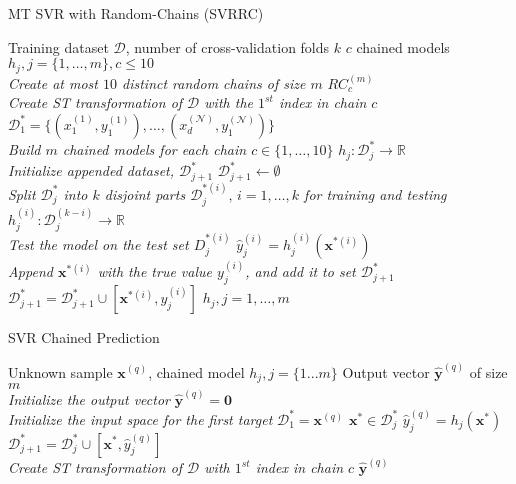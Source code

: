 \documentclass[preprint,12pt]{elsarticle}
\begin{document}
\begin{algorithm}[t!]
\caption{MT SVR with Random-Chains (SVRRC)}
\label{alg:SVRRC} 
\begin{algorithmic}[1]
\renewcommand{\algorithmicrequire}{\textbf{Input:}}
\renewcommand{\algorithmicensure}{\textbf{Output:}}
\REQUIRE Training dataset $\mathcal{D}$, number of cross-validation folds $k$
\ENSURE  $c$ chained models $h_j, j = \{1,\ldots,m\}, c \leq 10$
\\ \textit{Create at most $10$ distinct random chains of size $m$}
\STATE $RC_c^{(m)}$
\\ \textit{Create ST transformation of $\mathcal{D}$ with the $1^{st}$ index in chain $c$}
\STATE $\mathcal{D}_1^* = \{(x_1^{(1)},y_1^{(1)}),\ldots,(x_d^{(\mathcal N)},y_1^{(\mathcal N)})\}$
\\ \textit{Build $m$ chained models for each chain $c \in \{1,\ldots,10\}$}
\STATE $h_j : \mathcal{D}_j^* \rightarrow \mathbb{R}$
\\ \textit{Initialize appended dataset, $\mathcal{D}_{j+1}^*$}
\STATE $\mathcal{D}_{j+1}^* \leftarrow \emptyset$
\\ \textit{Split $\mathcal{D}_j^*$ into $k$ disjoint parts $\mathcal{D}_j^{*(i)}, \, i=1,\ldots,k$ for training and testing}
\STATE $h_j^{(i)} : \mathcal{D}_j^{(k-i)} \rightarrow \mathbb{R}$
\\ \textit{Test the model on the test set $D_j^{*(i)}$}
\STATE $\hat{y}_j^{(i)} = h_j^{(i)}(\bm x^{*(i)})$
\\ \textit{Append $\bm x^{*(i)}$ with the true value $y_j^{(i)}$, and add it to set $\mathcal{D}_{j+1}^*$}
\STATE $\mathcal{D}_{j+1}^* = \mathcal{D}_{j+1}^* \cup [\bm x^{*(i)},y_j^{(i)}]$
\ENDFOR
\ENDFOR
\ENDIF
\ENDFOR
\RETURN $h_j, j=1,\ldots,m$ 
\end{algorithmic} 
\end{algorithm}

\begin{algorithm}[t!]
\caption{SVR Chained Prediction}
\label{alg:SVRCP} 
\begin{algorithmic}[1]
\renewcommand{\algorithmicrequire}{\textbf{Input:}}
\renewcommand{\algorithmicensure}{\textbf{Output:}}
\REQUIRE Unknown sample $\bm x^{(q)}$, chained model ${h_j, j=\{1...m\}}$
\ENSURE  Output vector $\hat{\bm y}^{(q)}$ of size $m$
\\ \textit{Initialize the output vector}
\STATE $\hat{\bm y}^{(q)} = \textbf{0}$
\\ \textit{Initialize the input space for the first target}
\STATE $\mathcal{D}_1^* = \bm x^{(q)}$
\STATE $\bm x^* \in \mathcal{D}_j^*$
\STATE $\hat{y}_j^{(q)} = h_j(\bm x^*)$
\STATE $\mathcal{D}_{j+1}^* = \mathcal{D}_j^* \cup [\bm x^*, \hat{y}_j^{(q)}]$
\ENDFOR
\\ \textit{Create ST transformation of $\mathcal{D}$ with $1^{st}$ index in chain $c$}
\RETURN $\hat{\bm y}^{(q)}$ 
\end{algorithmic} 
\end{algorithm}
\end{document}
